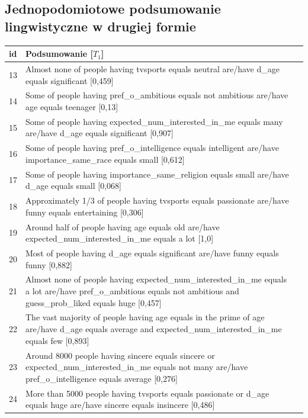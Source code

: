 \documentclass{classrep}
\begin{document}
\subsection{Jednopodomiotowe podsumowanie lingwistyczne w drugiej formie}

\begin{center}
  \begin{table}[H]
    \begin{tabularx}{\textwidth}{lXc}
    
    id & Podsumowanie [$T_1$] \\ \hline 
   13 & Almost none of people having tvsports equals neutral are/have d\_age equals significant [0,459] \\ \hline
   14 & Some of people having pref\_o\_ambitious equals not ambitious are/have age equals teenager [0,13] \\ \hline
   15 & Some of people having expected\_num\_interested\_in\_me equals many are/have d\_age equals significant [0,907] \\ \hline
   16 & Some of people having pref\_o\_intelligence equals intelligent are/have importance\_same\_race equals small [0,612] \\ \hline
   17 & Some of people having importance\_same\_religion equals small are/have d\_age equals small [0,068] \\ \hline
   18 & Approximately 1/3 of people having tvsports equals passionate are/have funny equals entertaining [0,306] \\ \hline
   19 & Around half of people having age equals old are/have expected\_num\_interested\_in\_me equals a lot [1,0] \\ \hline 
   20 & Most of people having d\_age equals significant are/have funny equals funny [0,882] \\ \hline
   21 & Almost none of people having expected\_num\_interested\_in\_me equals a lot are/have pref\_o\_ambitious equals not ambitious and guess\_prob\_liked equals huge [0,457] \\ \hline
   22 & The vast majority of people having age equals in the prime of age are/have d\_age equals average and expected\_num\_interested\_in\_me equals few [0,893] \\ \hline 
   23 & Around 8000 people having sincere equals sincere or expected\_num\_interested\_in\_me equals not many are/have pref\_o\_intelligence equals average [0,276]\\ \hline
   24 & More than 5000 people having tvsports equals passionate or d\_age equals huge are/have sincere equals insincere [0,486] \\ \hline 





\end{tabularx}
\end{table}
\end{center}
\end{document}
